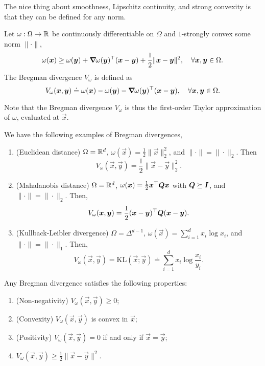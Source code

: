 The nice thing about smoothness, Lipschitz continuity, and strong convexity is that they can be
defined for any norm.

\begin{definition}
    Let $\omega: \Omega \to \mathbb{R}$ be continuously differentiable on $\Omega$ and $1$-strongly
    convex \wrt some norm $\| \cdot \|$, \[
        \omega(\bm{x}) \geq \omega(\bm{y}) + \bm{\nabla}_{\! } \omega(\bm{y})^\top(\bm{x} - \bm{y}) + \frac{1}{2} \| \bm{x} - \bm{y} \|^2, \quad \forall \bm{x},\bm{y} \in \Omega.
    \]
    The Bregman divergence $V_{\omega}$ is defined as \[
        V_{\omega}(\bm{x}, \bm{y}) \doteq \omega(\bm{x}) - \omega(\bm{y}) - \bm{\nabla}_{\! } \omega(\bm{y})^\top(\bm{x} - \bm{y}), \quad \forall \bm{x}, \bm{y} \in \Omega.
    \]
\end{definition}

Note that the Bregman divergence $V_{\omega}$ is thus the first-order Taylor approximation of
$\omega$, evaluated at $\vec{x}$.

\begin{example}
    \label{ex:bregman}
    We have the following examples of Bregman divergences,
    \begin{enumerate}
        \item \label{item:euc} (Euclidean distance) $\Omega = \mathbb{R}^d$, $\omega(\vec{x}) = \frac{1}{2} \| \vec{x} \|_2^2$, and $\|
                  \cdot \| = \| \cdot \|_2$. Then \[
                  V_{\omega}(\vec{x}, \vec{y}) = \frac{1}{2} \| \vec{x} - \vec{y} \|_2^2.
              \]
        \item (Mahalanobis distance) $\Omega = \mathbb{R}^d$, $\omega(\bm{x}) = \frac{1}{2} \bm{x}^\top \bm{Q}
                  \bm{x}$ with $\bm{Q} \succeq \bm{I}$, and $\| \cdot \| = \| \cdot \|_2$. Then, \[
                  V_{\omega}(\bm{x}, \bm{y}) = \frac{1}{2} (\bm{x} - \bm{y})^\top \bm{Q} (\bm{x} - \bm{y}).
              \]
        \item \label{item:kl} (Kullback-Leibler divergence) $\Omega = \Delta^{d-1}$, $\omega(\vec{x}) = \sum_{i=1}^{d} x_i \log
                  x_i$, and $\| \cdot \| = \| \cdot \|_1$. Then, \[
                  V_{\omega}(\vec{x}, \vec{y}) = \mathrm{KL}(\vec{x}; \vec{y}) \doteq \sum_{i=1}^{d} x_i \log \frac{x_i}{y_i}.
              \]
    \end{enumerate}
\end{example}

\begin{lemma}
    Any Bregman divergence satisfies the following properties:
    \begin{enumerate}
        \item (Non-negativity) $V_{\omega}(\vec{x}, \vec{y}) \geq 0$;
        \item (Convexity) $V_{\omega}(\vec{x}, \vec{y})$ is convex in $\vec{x}$;
        \item (Positivity) $V_{\omega}(\vec{x}, \vec{y}) = 0$ if and only if $\vec{x} = \vec{y}$;
        \item $V_{\omega}(\vec{x}, \vec{y}) \geq \frac{1}{2} \| \vec{x} - \vec{y} \|^2$.
    \end{enumerate}
\end{lemma}

